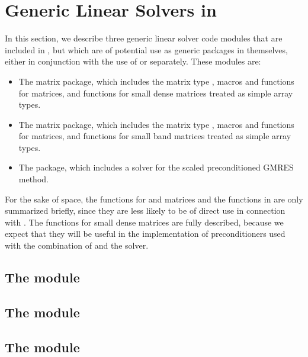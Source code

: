 \chapter{Generic Linear Solvers in {\sundials}}\label{s:gen_linsolv}
In this section, we describe three generic linear solver code modules that 
are included in {\cvode}, but which are of potential use as generic packages in
themselves, either in conjunction with the use of {\cvode} or separately.
These modules are:
\begin{itemize}
\item The {\dense} matrix package, which includes the matrix type ,
      macros and functions for  matrices, and functions
      for small dense matrices treated as simple array types.
\item The {\band} matrix package, which includes the matrix type ,
      macros and functions for  matrices, and functions
      for small band matrices treated as simple array types.
\item The {\spgmr} package, which includes a solver for the scaled
      preconditioned GMRES method.
\end{itemize}

For the sake of space, the functions for  and
 matrices and the functions in {\spgmr} are only summarized
briefly, since they are less likely to be of direct use in connection
with {\cvode}.  The functions for small dense matrices are fully
described, because we expect that they will be useful in the
implementation of preconditioners used with the combination of {\cvode}
and the {\cvspgmr} solver.

\section{The {\dense} module}\label{ss:dense}


\section{The {\band} module}\label{ss:band}


\section{The {\spgmr} module}\label{ss:spgmr}


